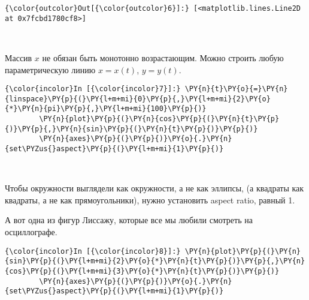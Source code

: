            \begin{Verbatim}[commandchars=\\\{\}]
{\color{outcolor}Out[{\color{outcolor}6}]:} [<matplotlib.lines.Line2D at 0x7fcbd1780cf8>]
\end{Verbatim}
        
    \begin{center}
    \end{center}
    { \hspace*{\fill} \\}
    
    Массив \(x\) не обязан быть монотонно возрастающим. Можно строить любую
параметрическую линию \(x=x(t)\), \(y=y(t)\).

    \begin{Verbatim}[commandchars=\\\{\}]
{\color{incolor}In [{\color{incolor}7}]:} \PY{n}{t}\PY{o}{=}\PY{n}{linspace}\PY{p}{(}\PY{l+m+mi}{0}\PY{p}{,}\PY{l+m+mi}{2}\PY{o}{*}\PY{n}{pi}\PY{p}{,}\PY{l+m+mi}{100}\PY{p}{)}
        \PY{n}{plot}\PY{p}{(}\PY{n}{cos}\PY{p}{(}\PY{n}{t}\PY{p}{)}\PY{p}{,}\PY{n}{sin}\PY{p}{(}\PY{n}{t}\PY{p}{)}\PY{p}{)}
        \PY{n}{axes}\PY{p}{(}\PY{p}{)}\PY{o}{.}\PY{n}{set\PYZus{}aspect}\PY{p}{(}\PY{l+m+mi}{1}\PY{p}{)}
\end{Verbatim}

    \begin{center}
    \end{center}
    { \hspace*{\fill} \\}
    
    Чтобы окружности выглядели как окружности, а не как эллипсы, (а квадраты
как квадраты, а не как прямоугольники), нужно установить aspect ratio,
равный 1.

А вот одна из фигур Лиссажу, которые все мы любили смотреть на
осциллографе.

    \begin{Verbatim}[commandchars=\\\{\}]
{\color{incolor}In [{\color{incolor}8}]:} \PY{n}{plot}\PY{p}{(}\PY{n}{sin}\PY{p}{(}\PY{l+m+mi}{2}\PY{o}{*}\PY{n}{t}\PY{p}{)}\PY{p}{,}\PY{n}{cos}\PY{p}{(}\PY{l+m+mi}{3}\PY{o}{*}\PY{n}{t}\PY{p}{)}\PY{p}{)}
        \PY{n}{axes}\PY{p}{(}\PY{p}{)}\PY{o}{.}\PY{n}{set\PYZus{}aspect}\PY{p}{(}\PY{l+m+mi}{1}\PY{p}{)}
\end{Verbatim}

